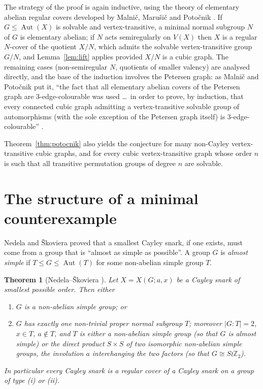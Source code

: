 \documentclass[11pt,a4paper]{article}
\newtheorem{theorem}{Theorem}[section]
\theoremstyle{definition}
\theoremstyle{remark}
\newcommand{\Aut}{\operatorname{Aut}}
\newcommand{\ZZ}{\mathbb{Z}}
\newcommand{\X}[3]{X(#1;#2,#3)}
\begin{document}
The strategy of the proof is again inductive, using the theory of elementary abelian regular covers developed by Malni\v{c}, Maru\v{s}i\v{c} and Poto\v{c}nik \cite{MMP04,MalnicPotocnik06}.  If $G\le\Aut(X)$ is solvable and vertex-transitive, a minimal normal subgroup $N$ of $G$ is elementary abelian; if $N$ acts semiregularly on $V(X)$ then $X$ is a regular $N$-cover of the quotient $X/N$, which admits the solvable vertex-transitive group $G/N$, and Lemma~\ref{lem:lift} applies provided $X/N$ is a cubic graph.  The remaining cases (non-semiregular $N$, quotients of smaller valency) are analysed directly, and the base of the induction involves the Petersen graph: as Malni\v{c} and Poto\v{c}nik put it, ``the fact that all elementary abelian covers of the Petersen graph are $3$-edge-colourable was used \dots\ in order to prove, by induction, that every connected cubic graph admitting a vertex-transitive solvable group of automorphisms (with the sole exception of the Petersen graph itself) is $3$-edge-colourable'' \cite[\S1]{MalnicPotocnik06}.

Theorem~\ref{thm:potocnik} also yields the conjecture for many non-Cayley vertex-transitive cubic graphs, and for every cubic vertex-transitive graph whose order $n$ is such that all transitive permutation groups of degree $n$ are solvable.

\section{The structure of a minimal counterexample}\label{sec:minimal}

Nedela and \v{S}koviera proved that a smallest Cayley snark, if one exists, must come from a group that is ``almost as simple as possible''.  A group $G$ is \emph{almost simple} if $T\le G\le\Aut(T)$ for some non-abelian simple group $T$.

\begin{theorem}[Nedela--\v{S}koviera \cite{NS01}]\label{thm:NS}
Let $X=\X{G}{a}{x}$ be a Cayley snark of smallest possible order.  Then either
\begin{enumerate}[label=\textup{(\roman*)}]
\item $G$ is a non-abelian simple group; or
\item $G$ has exactly one non-trivial proper normal subgroup $T$; moreover $|G:T|=2$, $x\in T$, $a\notin T$, and $T$ is either a non-abelian simple group (so that $G$ is almost simple) or the direct product $S\times S$ of two isomorphic non-abelian simple groups, the involution $a$ interchanging the two factors (so that $G\cong S\wr\ZZ_2$).
\end{enumerate}
In particular every Cayley snark is a regular cover of a Cayley snark on a group of type \textup{(i)} or \textup{(ii)}.
\end{theorem}
\end{document}
